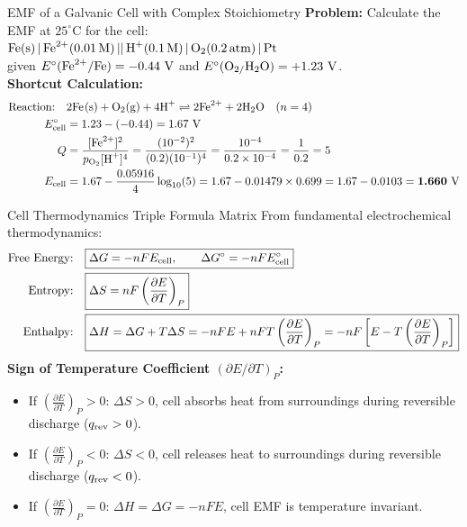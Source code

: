\documentclass[11pt,a4paper]{report}
\newcommand{\ans}[1]{\ifmmode\bm{#1}\else\textbf{#1}\fi}
\begin{document}
\begin{microbox}{EMF of a Galvanic Cell with Complex Stoichiometry}
\textbf{Problem:} Calculate the EMF at $25^\circ\text{C}$ for the cell:\\
$\ce{Fe(s) | Fe^{2+}(0.01 M) || H+(0.1 M) | O2(0.2 atm) | Pt}$\\
given $E^\circ(\ce{Fe^{2+}/Fe}) = -0.44\text{ V}$ and $E^\circ(\ce{O2/H2O}) = +1.23\text{ V}$.\\
\textbf{Shortcut Calculation:}
\begin{align*}
\text{Reaction:} \quad & 2\ce{Fe(s)} + \ce{O2(g)} + 4\ce{H+} \rightleftharpoons 2\ce{Fe^{2+}} + 2\ce{H2O} \quad (n = 4) \\
E^\circ_{\rm cell} &= 1.23 - (-0.44) = 1.67\text{ V} \\
Q &= \frac{[\ce{Fe^{2+}}]^2}{p_{\ce{O2}} [\ce{H+}]^4} = \frac{(10^{-2})^2}{(0.2)(10^{-1})^4} = \frac{10^{-4}}{0.2 \times 10^{-4}} = \frac{1}{0.2} = 5 \\
E_{\rm cell} &= 1.67 - \frac{0.05916}{4}\log_{10}(5) = 1.67 - 0.01479 \times 0.699 = 1.67 - 0.0103 = \ans{1.660\text{ V}}
\end{align*}
\end{microbox}

\begin{shortcutbox}{Cell Thermodynamics Triple Formula Matrix}
From fundamental electrochemical thermodynamics:
\begin{align}
\text{Free Energy:} \quad &\boxed{\Delta G = -n F E_{\rm cell}, \qquad \Delta G^\circ = -n F E^\circ_{\rm cell}} \\
\text{Entropy:} \quad &\boxed{\Delta S = n F \left(\frac{\partial E}{\partial T}\right)_P} \\
\text{Enthalpy:} \quad &\boxed{\Delta H = \Delta G + T \Delta S = -n F E + n F T \left(\frac{\partial E}{\partial T}\right)_P = -n F \left[ E - T\left(\frac{\partial E}{\partial T}\right)_P \right]}
\end{align}
\textbf{Sign of Temperature Coefficient $(\partial E/\partial T)_P$:}
\begin{itemize}
    \item If $\left(\frac{\partial E}{\partial T}\right)_P > 0$: $\Delta S > 0$, cell absorbs heat from surroundings during reversible discharge ($q_{\rm rev} > 0$).
    \item If $\left(\frac{\partial E}{\partial T}\right)_P < 0$: $\Delta S < 0$, cell releases heat to surroundings during reversible discharge ($q_{\rm rev} < 0$).
    \item If $\left(\frac{\partial E}{\partial T}\right)_P = 0$: $\Delta H = \Delta G = -n F E$, cell EMF is temperature invariant.
\end{itemize}
\end{shortcutbox}
\end{document}
